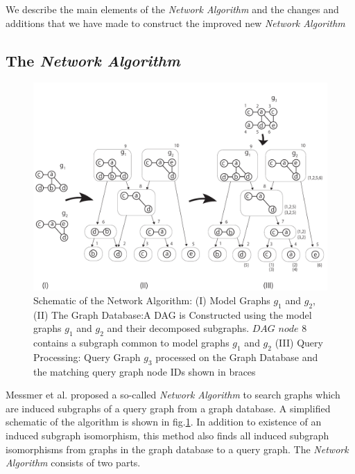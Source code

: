 We describe the main elements of the \textit{Network Algorithm}  and the changes and additions that we have made to construct the improved new 
\textit{Network Algorithm}
\subsection{The \textit{Network Algorithm}}


\begin{figure}
\centering
\includegraphics[width=1.0\textwidth]{dag_construction_query_processing6.pdf}
\caption{Schematic of the Network Algorithm: (I) Model Graphs $g_1$ and $g_2$, (II) The Graph Database:A DAG is Constructed using  the model graphs $g_1$ and $g_2$ and their decomposed subgraphs. $DAG$ $node$ $8$ contains a subgraph common to model graphs $g_1$ and $g_2$  (III) Query Processing: Query Graph $g_3$ processed on the Graph Database and the matching query graph node IDs shown in braces}
\label{fig:fig2}
\end{figure}


Messmer et al.\cite{messmer_bunke2000} proposed a so-called \textit{Network Algorithm} to search graphs which are induced subgraphs of a 
query graph from a graph database. A simplified schematic of the algorithm is shown in fig.\ref{fig:fig2}. In addition to existence of an induced subgraph isomorphism, this method also finds all induced subgraph isomorphisms from graphs in the graph database to a query graph.
The \textit{Network Algorithm} consists of two parts.

